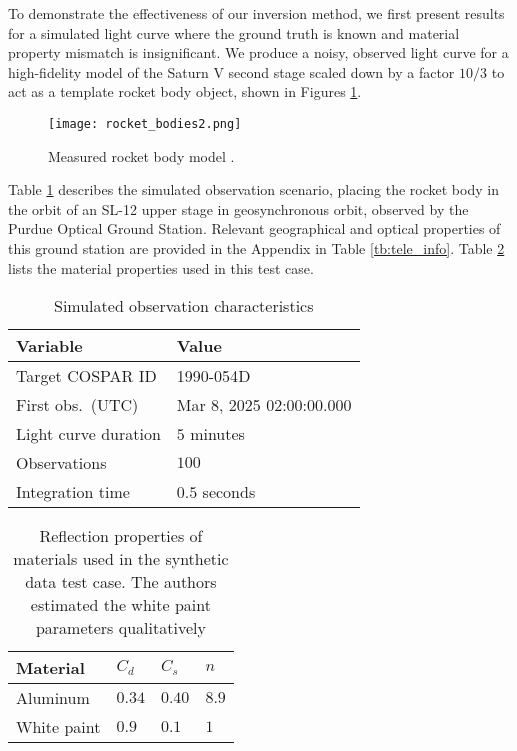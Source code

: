 \documentclass[a4paper,twocolumn]{spaceDebrisC} %
\newcommand{\figsmall}[0]{0.3\textwidth}
\begin{document}
To demonstrate the effectiveness of our inversion method, we first present results for a simulated light curve where the ground truth is known and material property mismatch is insignificant. We produce a noisy, observed light curve for a high-fidelity model of the Saturn V second stage scaled down by a factor $10/3$ to act as a template rocket body object, shown in Figures \ref{fig:meas_model}.

\begin{figure}[H]
  \centering
  \texttt{[image: rocket\_bodies2.png]}
  \caption{Measured rocket body model \cite{nasa_models}.}
  \label{fig:meas_model}
\end{figure}

Table \ref{tb:case1_in} describes the simulated observation scenario, placing the rocket body in the orbit of an SL-12 upper stage in geosynchronous orbit, observed by the Purdue Optical Ground Station. Relevant geographical and optical properties of this ground station are provided in the Appendix in Table \ref{tb:tele_info}. Table \ref{tb:synth_matprops} lists the material properties used in this test case.

\begin{table}[H]
  \centering
  \caption{Simulated observation characteristics}
  \vspace*{6pt}
  \begin{tabular}{|l|l|}
  \hline
  \textbf{Variable} & \textbf{Value} \\ \hline
 Target COSPAR ID & 1990-054D \\ \hline
 First obs.\ (UTC) & Mar 8, 2025 02:00:00.000 \\ \hline
 Light curve duration & $5$ minutes \\ \hline
 Observations & $100$ \\ \hline
 Integration time & $0.5$ seconds \\ \hline
  \end{tabular}
  \label{tb:case1_in}
\end{table}

\begin{table}[H]
  \centering
  \caption{Reflection properties of materials used in the synthetic data test case. The authors estimated the white paint parameters qualitatively}
  \vspace*{6pt}
  \begin{tabular}{|l|l|l|l|}
  \hline
  \textbf{Material} & $C_d$ & $C_s$ & $n$ \\ \hline
 Aluminum \cite{fankhauser2023} & $0.34$ & $0.40$ & $8.9$ \\ \hline
 White paint & $0.9$ & $0.1$ & $1$ \\ \hline
  \end{tabular}
  \label{tb:synth_matprops}
\end{table}
\end{document}
